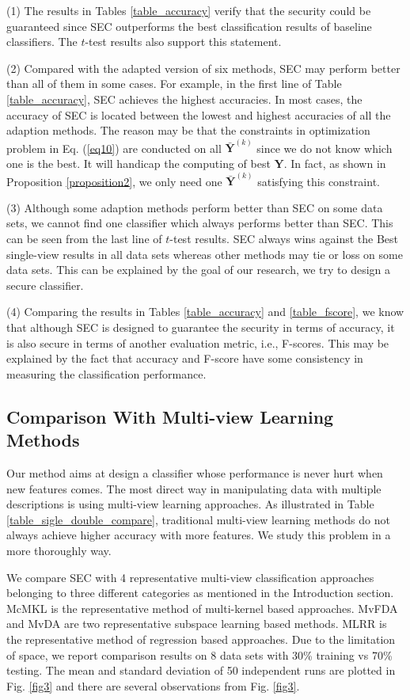 \documentclass[10pt,journal,compsoc]{IEEEtran}
\begin{document}
(1) The results in Tables \ref{table_accuracy} verify that the security could be guaranteed since SEC outperforms the best classification results of baseline classifiers. The $t$-test results also support this statement.

(2) Compared with the adapted version of six methods, SEC may perform better than all of them in some cases. For example, in the first line of Table \ref{table_accuracy}, SEC achieves the highest accuracies. In most cases, the accuracy of SEC is located between the lowest and highest accuracies of all the adaption methods. The reason may be that the constraints in optimization problem in Eq. (\ref{eq10}) are conducted on all $\bar{\mathbf{Y}}^{(k)}$ since we do not know which one is the best. It will handicap the computing of best $\mathbf{Y}$. In fact, as shown in Proposition \ref{proposition2}, we only need one $\bar{\mathbf{Y}}^{(k)}$ satisfying this constraint.

(3) Although some adaption methods perform better than SEC on some data sets, we cannot find one classifier which always performs better than SEC. This can be seen from the last line of $t$-test results. SEC always wins against the Best single-view results in all data sets whereas other methods may tie or loss on some data sets. This can be explained by the goal of our research, we try to design a secure classifier.

(4) Comparing the results in Tables \ref{table_accuracy} and \ref{table_fscore}, we know that although SEC is designed to guarantee the security in terms of accuracy, it is also secure in terms of another evaluation metric, i.e., F-scores. This may be explained by the fact that accuracy and F-score have some consistency in measuring the classification performance.



\subsection{Comparison With Multi-view Learning Methods}

Our method aims at design a classifier whose performance is never hurt when new features comes. The most direct way in manipulating data with multiple descriptions is using multi-view learning approaches. As illustrated in Table \ref{table_sigle_double_compare}, traditional multi-view learning methods do not always achieve higher accuracy with more features. We study this problem in a more thoroughly way.

We compare SEC with 4 representative multi-view classification approaches belonging to three different categories as mentioned in the Introduction section. McMKL \cite{icml/ZienO07} is the representative method of multi-kernel based approaches. MvFDA \cite{Diethe2008Multiview} and MvDA \cite{pami/KanSZLC16} are two representative subspace learning based methods. MLRR \cite{Zheng2015} is the representative method of regression based approaches. Due to the limitation of space, we report comparison results on 8 data sets with 30\% training vs 70\% testing. The mean and standard deviation of 50 independent runs are plotted in Fig. \ref{fig3} and there are several observations from Fig. \ref{fig3}.
\end{document}
